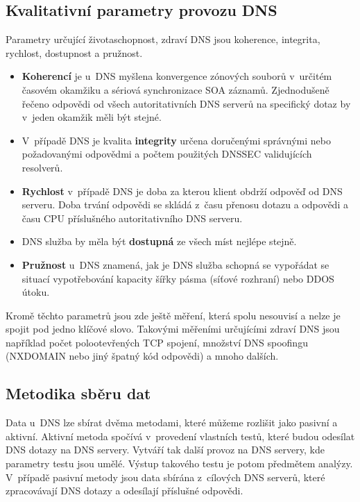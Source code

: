\documentclass[thesis=M,czech]{src/FITthesis}[2019/12/23]
\begin{document}
\subsection{Kvalitativní parametry provozu DNS}
Parametry určující životaschopnost, zdraví DNS jsou koherence, integrita, rychlost, dostupnost a pružnost. 

\begin{itemize}
	\item \textbf{Koherencí} je u~DNS myšlena konvergence zónových souborů v~určitém časovém okamžiku a sériová synchronizace SOA záznamů. Zjednodušeně řečeno odpovědi od všech autoritativních DNS serverů na specifický dotaz by v~jeden okamžik měli být stejné.
	\item V~případě DNS je kvalita \textbf{integrity} určena doručenými správnými nebo požadovanými odpovědmi a počtem použitých DNSSEC validujících resolverů.
	\item \textbf{Rychlost} v~případě DNS je doba za kterou klient obdrží odpověď od DNS serveru. Doba trvání odpovědi se skládá z~času přenosu dotazu a odpovědi a času CPU příslušného autoritativního DNS serveru.
	\item DNS služba by měla být \textbf{dostupná} ze všech míst nejlépe stejně. 
	\item \textbf{Pružnost} u~DNS znamená, jak je DNS služba schopná se vypořádat se situací vypotřebování kapacity šířky pásma (síťové rozhraní) nebo DDOS útoku. 
\end{itemize}

Kromě těchto parametrů jsou zde ještě měření, která spolu nesouvisí a nelze je spojit pod jedno klíčové slovo. Takovými měřeními určujícími zdraví DNS jsou například počet polootevřených TCP spojení, množství DNS spoofingu (NXDOMAIN nebo jiný špatný kód odpovědi) a mnoho dalších. \cite{icann-symposium}
 
\subsection{Metodika sběru dat}
Data u~DNS lze sbírat dvěma metodami, které můžeme rozlišit jako pasivní a aktivní. Aktivní metoda spočívá v~provedení vlastních testů, které budou odesílat DNS dotazy na DNS servery. Vytváří tak další provoz na DNS servery, kde parametry testu jsou umělé. Výstup takového testu je potom předmětem analýzy. V~případě pasivní metody jsou data sbírána z~cílových DNS serverů, které zpracovávají DNS dotazy a odesílají příslušné odpovědi. \cite{act-pas-mon}
\end{document}
